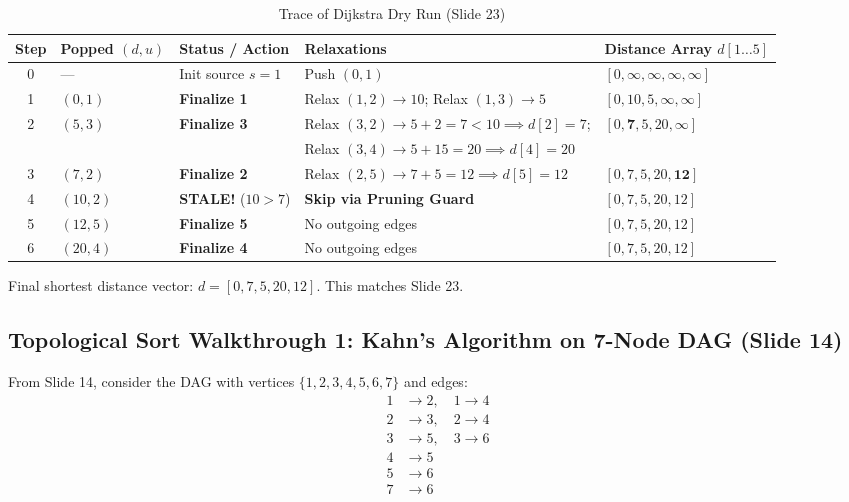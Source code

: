 \documentclass[10pt,journal,compsoc,onecolumn]{IEEEtran}
\begin{document}
\begin{table}[h]
\centering
\caption{Trace of Dijkstra Dry Run (Slide 23)}
\label{tab:dijkstra_trace_slide23}
\begin{tabular}{cllll}
\toprule
\textbf{Step} & \textbf{Popped} $(d, u)$ & \textbf{Status / Action} & \textbf{Relaxations} & \textbf{Distance Array} $d[1 \dots 5]$ \\
\midrule
0 & --- & Init source $s=1$ & Push $(0, 1)$ & $[0, \infty, \infty, \infty, \infty]$ \\
1 & $(0, 1)$ & \textbf{Finalize 1} & Relax $(1, 2) \to 10$; Relax $(1, 3) \to 5$ & $[0, 10, 5, \infty, \infty]$ \\
2 & $(5, 3)$ & \textbf{Finalize 3} & Relax $(3, 2) \to 5+2=7 < 10 \implies d[2]=7$; & $[0, \mathbf{7}, 5, 20, \infty]$ \\
  &          &                     & Relax $(3, 4) \to 5+15=20 \implies d[4]=20$   & \\
3 & $(7, 2)$ & \textbf{Finalize 2} & Relax $(2, 5) \to 7+5=12 \implies d[5]=12$     & $[0, 7, 5, 20, \mathbf{12}]$ \\
4 & $(10, 2)$ & \textbf{STALE!} ($10 > 7$) & \textbf{Skip via Pruning Guard}      & $[0, 7, 5, 20, 12]$ \\
5 & $(12, 5)$ & \textbf{Finalize 5} & No outgoing edges                              & $[0, 7, 5, 20, 12]$ \\
6 & $(20, 4)$ & \textbf{Finalize 4} & No outgoing edges                              & $[0, 7, 5, 20, 12]$ \\
\bottomrule
\end{tabular}
\end{table}

Final shortest distance vector: $d = [0, 7, 5, 20, 12]$. This matches Slide 23.

\subsection{Topological Sort Walkthrough 1: Kahn's Algorithm on 7-Node DAG (Slide 14)}
From Slide 14, consider the DAG with vertices $\{1, 2, 3, 4, 5, 6, 7\}$ and edges:
\begin{align*}
1 &\to 2, \quad 1 \to 4 \\
2 &\to 3, \quad 2 \to 4 \\
3 &\to 5, \quad 3 \to 6 \\
4 &\to 5 \\
5 &\to 6 \\
7 &\to 6
\end{align*}
\end{document}
